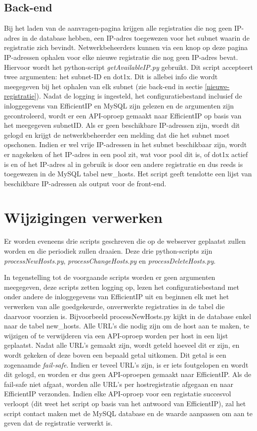 \subsection{Back-end}
Bij het laden van de aanvragen-pagina krijgen alle registraties die nog geen IP-adres in de database hebben, een IP-adres toegewezen voor het subnet waarin de registratie zich bevindt.
Netwerkbeheerders kunnen via een knop op deze pagina IP-adressen ophalen voor elke nieuwe registratie die nog geen IP-adres bevat.
Hiervoor wordt het python-script \textit{getAvailableIP.py} gebruikt. Dit script accepteert twee argumenten: het subnet-ID en dot1x. Dit is allebei info die wordt meegegeven bij het ophalen van elk subnet (zie back-end in sectie \ref{nieuwe-registratie}). Nadat de logging is ingesteld, het configuratiebestand inclusief de inloggegevens van EfficientIP en MySQL zijn gelezen en de argumenten zijn gecontroleerd, wordt er een API-oproep gemaakt naar EfficientIP op basis van het meegegeven subnetID. Als er geen beschikbare IP-adressen zijn, wordt dit gelogd en krijgt de netwerkbeheerder een melding dat die het subnet moet opschonen.
Indien er wel vrije IP-adressen in het subnet beschikbaar zijn, wordt er nagekeken of het IP-adres in een pool zit, wat voor pool dit is, of dot1x actief is en of het IP-adres al in gebruik is door een andere registratie en dus reeds is toegewezen in de MySQL tabel new\_hosts. Het script geeft tenslotte een lijst van beschikbare IP-adressen als output voor de front-end.

\section{Wijzigingen verwerken}
\label{wijzigingen-verwerken}
Er worden eveneens drie scripts geschreven die op de webserver geplaatst zullen worden en die periodiek zullen draaien.
Deze drie python-scripts zijn \\\textit{processNewHosts.py}, \textit{processChangeHosts.py} en \textit{processDeleteHosts.py}.

In tegenstelling tot de voorgaande scripts worden er geen argumenten meegegeven, deze scripts zetten logging op, lezen het configuratiebestand met onder andere de inloggegevens van EfficientIP uit en beginnen elk met het verwerken van alle goedgekeurde, onverwerkte registraties in de tabel die daarvoor voorzien is. Bijvoorbeeld processNewHosts.py kijkt in de database enkel naar de tabel new\_hosts.
Alle URL's die nodig zijn om de host aan te maken, te wijzigen of te verwijderen via een API-oproep worden per host in een lijst geplaatst.
Nadat alle URL's gemaakt zijn, wordt geteld hoeveel dit er zijn, en wordt gekeken of deze boven een bepaald getal uitkomen.
Dit getal is een zogenaamde \textit{fail-safe}. Indien er teveel URL's zijn, is er iets foutgelopen en wordt dit gelogd, en worden er dus geen API-oproepen gemaakt naar EfficientIP.
Als de fail-safe niet afgaat, worden alle URL's per hostregistratie afgegaan en naar EfficientIP verzonden. 
Indien elke API-oproep voor een registatie succesvol verloopt (dit weet het script op basis van het antwoord van EfficientIP), zal het script contact maken met de MySQL database en de waarde aanpassen om aan te geven dat de registratie verwerkt is.



